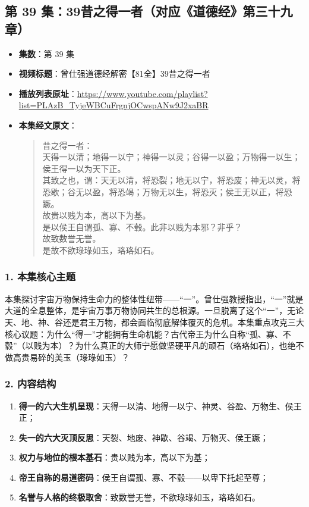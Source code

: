 \clearpage

\subsection{第 39 集：39昔之得一者（对应《道德经》第三十九章）}
\label{sec:ep39}

\begin{itemize}
    \item \textbf{集数}：第 39 集
    \item \textbf{视频标题}：曾仕强道德经解密【81全】39昔之得一者
    \item \textbf{播放列表原址}：\url{https://www.youtube.com/playlist?list=PLAzB_TyjeWBCuFrgnjOCwspANw9J2xaBR}
    \item \textbf{本集经文原文}：
    \begin{quote}\kaishu
    昔之得一者：\\
    天得一以清；地得一以宁；神得一以灵；谷得一以盈；万物得一以生；侯王得一以为天下正。\\
    其致之也，谓：天无以清，将恐裂；地无以宁，将恐废；神无以灵，将恐歇；谷无以盈，将恐竭；万物无以生，将恐灭；侯王无以正，将恐蹶。\\
    故贵以贱为本，高以下为基。\\
    是以侯王自谓孤、寡、不毂。此非以贱为本邪？非乎？\\
    故致数誉无誉。\\
    是故不欲琭琭如玉，珞珞如石。
    \end{quote}
\end{itemize}

\subsubsection{1. 本集核心主题}
本集探讨宇宙万物保持生命力的整体性纽带——“一”。曾仕强教授指出，“一”就是大道的全息整体，是宇宙万事万物协同共生的总根源。一旦脱离了这个“一”，无论天、地、神、谷还是君王万物，都会面临彻底解体覆灭的危机。本集重点攻克三大核心议题：为什么“得一”才能拥有生命机能？古代帝王为什么自称“孤、寡、不毂”（以贱为本）？为什么真正的大师宁愿做坚硬平凡的顽石（珞珞如石），也绝不做高贵易碎的美玉（琭琭如玉）？

\subsubsection{2. 内容结构}
\begin{enumerate}
    \item \textbf{得一的六大生机呈现}：天得一以清、地得一以宁、神灵、谷盈、万物生、侯王正；
    \item \textbf{失一的六大灭顶反思}：天裂、地废、神歇、谷竭、万物灭、侯王蹶；
    \item \textbf{权力与地位的根本基石}：贵以贱为本，高以下为基；
    \item \textbf{帝王自称的易道密码}：侯王自谓孤、寡、不毂——以卑下托起至尊；
    \item \textbf{名誉与人格的终极取舍}：致数誉无誉，不欲琭琭如玉，珞珞如石。
\end{enumerate}

